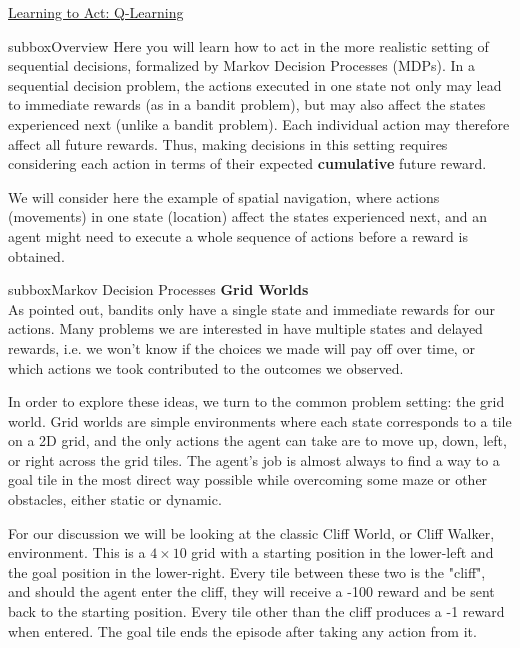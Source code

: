 \begin{textbox}{\href{https://compneuro.neuromatch.io/tutorials/W3D4_ReinforcementLearning/student/W3D4_Tutorial3.html}{Learning to Act: Q-Learning } }

\begin{subbox}{subbox}{Overview}
\scriptsize
Here you will learn how to act in the more realistic setting of sequential decisions, formalized by Markov Decision Processes (MDPs). In a sequential decision problem, the actions executed in one state not only may lead to immediate rewards (as in a bandit problem), but may also affect the states experienced next (unlike a bandit problem). Each individual action may therefore affect all future rewards. Thus, making decisions in this setting requires considering each action in terms of their expected \textbf{cumulative} future reward.

We will consider here the example of spatial navigation, where actions (movements) in one state (location) affect the states experienced next, and an agent might need to execute a whole sequence of actions before a reward is obtained.


\end{subbox}

\begin{subbox}{subbox}{Markov Decision Processes}
\scriptsize
\textbf{Grid Worlds}\\

As pointed out, bandits only have a single state and immediate rewards for our actions. Many problems we are interested in have multiple states and delayed rewards, i.e. we won't know if the choices we made will pay off over time, or which actions we took contributed to the outcomes we observed.

In order to explore these ideas, we turn to the common problem setting: the grid world. Grid worlds are simple environments where each state corresponds to a tile on a 2D grid, and the only actions the agent can take are to move up, down, left, or right across the grid tiles. The agent's job is almost always to find a way to a goal tile in the most direct way possible while overcoming some maze or other obstacles, either static or dynamic.

For our discussion we will be looking at the classic Cliff World, or Cliff Walker, environment. This is a $4 \times 10$ grid with a starting position in the lower-left and the goal position in the lower-right. Every tile between these two is the "cliff", and should the agent enter the cliff, they will receive a -100 reward and be sent back to the starting position. Every tile other than the cliff produces a -1 reward when entered. The goal tile ends the episode after taking any action from it.


\end{subbox}
\end{textbox}

